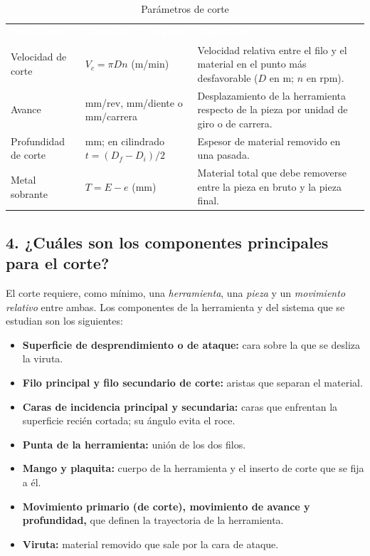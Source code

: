 \documentclass[12pt,a4paper]{article}
\newcommand{\encab}[1]{\textcolor{white}{\sffamily\bfseries #1}}
\begin{document}
\begin{table}[!htb]
	\centering
	\caption{Parámetros de corte}\label{tab:parametros}
	\small
	\begin{tabularx}{\linewidth}{>{\raggedright\arraybackslash}p{3.6cm}
			>{\raggedright\arraybackslash}p{3.6cm} X}
		\rowcolor{darkblue}
		\encab{Parámetro}    & \encab{Expresión / unidad}        &
		\encab{Significado}
		\\
		Velocidad de corte   & $V_c=\pi D n$ (m/min)             & Velocidad
		relativa entre el filo y
		el material en el punto más desfavorable ($D$ en m; $n$ en rpm).
		\\
		Avance               & mm/rev, mm/diente o mm/carrera    & Desplazamiento de
		la herramienta
		respecto de la pieza por unidad de giro o de carrera.
		\\
		Profundidad de corte & mm; en cilindrado $t=(D_f-D_i)/2$ & Espesor de
		material removido
		en una pasada.
		\\
		Metal sobrante       & $T=E-e$ (mm)                      & Material total
		que debe
		removerse entre la pieza en bruto y la pieza final.
		\\
	\end{tabularx}
\end{table}

\subsection*{4. ¿Cuáles son los componentes principales para el corte?}

El corte requiere, como mínimo, una \emph{herramienta}, una \emph{pieza} y un
\emph{movimiento relativo} entre ambas. Los componentes de la herramienta y del
sistema que se estudian son los siguientes:

\begin{itemize}
	\item \textbf{Superficie de desprendimiento o de ataque:} cara sobre la que
	      se desliza la viruta.\\[-10pt]
	\item \textbf{Filo principal y filo secundario de corte:} aristas que separan
	      el material.\\[-10pt]
	\item \textbf{Caras de incidencia principal y secundaria:} caras que
	      enfrentan la superficie recién cortada; su ángulo evita el
	      roce.\\[-10pt]
	\item \textbf{Punta de la herramienta:} unión de los dos filos.\\[-10pt]
	\item \textbf{Mango y plaquita:} cuerpo de la herramienta y el inserto de
	      corte
	      que se fija a él.\\[-10pt]
	\item \textbf{Movimiento primario (de corte), movimiento de avance y
		      profundidad,} que definen la trayectoria de la herramienta.\\[-10pt]
	\item \textbf{Viruta:} material removido que sale por la cara de ataque.
\end{itemize}
\end{document}
